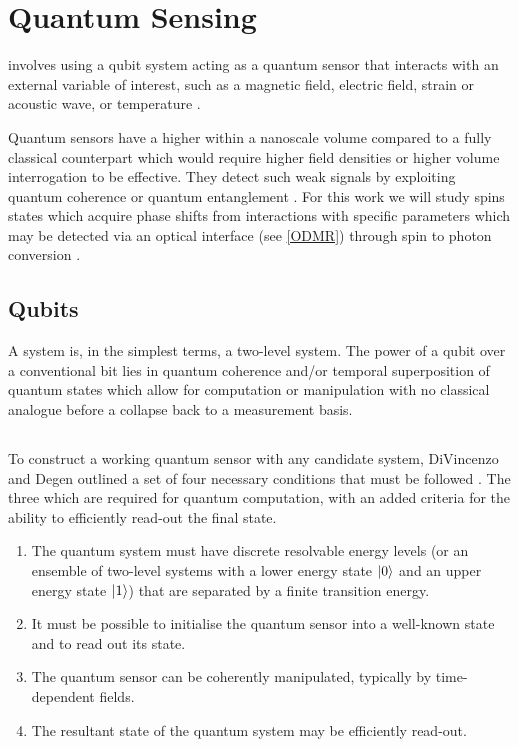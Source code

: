 \section{Quantum Sensing}
 involves using a qubit system acting as a quantum sensor that interacts with an external variable of
interest, such as a magnetic field, electric field, strain or acoustic wave, or temperature \cite{Castelletto_2024}. 

Quantum sensors have a higher  within a nanoscale volume compared to a fully classical counterpart which would require higher field densities or higher volume interrogation to be effective. 
They detect such weak signals by exploiting quantum coherence or quantum entanglement
\cite{Kin2021}
.
For this work we will study spins states which acquire phase shifts from interactions with specific parameters which may be detected via an optical interface (see \ref{ODMR}) through spin to photon conversion
\cite{Wolfowicz2021}
. 


\subsection{Qubits}
A  system is, in the simplest terms, a two-level system. The power of a qubit over a conventional bit lies in quantum coherence and/or
temporal superposition of quantum states which allow for computation or manipulation with no classical analogue before a collapse back to a measurement basis. 

\subsection{}
To construct a working quantum sensor with any candidate system, DiVincenzo and Degen outlined a set of four necessary conditions that must be followed \cite{Crawford2021, RevModPhys.89.035002, DiVincenzo1995}. The three which are required for quantum computation, with an added criteria for the ability to efficiently read-out the final state. 

\begin{enumerate}
    \item The quantum system must have discrete resolvable energy levels (or an ensemble of two-level systems with a lower energy state $\ket{0}$ and an upper energy state $\ket{1}$) that are separated by a finite transition energy. 
    \item It must be possible to initialise the quantum sensor into a well-known state and to read out its state. 
    \item The quantum sensor can be coherently manipulated, typically by time-dependent fields.
    \item The resultant state of the quantum system may be efficiently read-out. 
\end{enumerate} 


